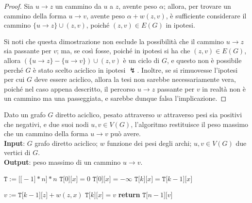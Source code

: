 \documentclass[14pt]{extreport}
\theoremstyle{definition}
\theoremstyle{definition}
\begin{document}
\begin{proof}
    Sia $u \rightarrow z$ un cammino da $u$ a $z$, avente peso $\alpha$; allora, per trovare un cammino della forma $u \rightarrow v$, avente peso $\alpha + w(z, v)$, è sufficiente considerare il cammino $\{u \rightarrow z\} \cup (z, v)$, poiché $(z, v) \in E(G)$ in ipotesi.

    Si noti che questa dimostrazione non esclude la possibilità che il cammino $u \rightarrow z$ sia passante per $v$; ma, se così fosse, poiché in ipotesi si ha che $(z, v) \in E(G)$, allora $(\{u \rightarrow z\} - \{u \rightarrow v\}) \cup (z, v)$ è un ciclo di $G$, e questo non è possibile perché $G$ è stato scelto aciclico in ipotesi $\lightning$. Inoltre, se si rimuovesse l'ipotesi per cui $G$ deve essere aciclico, allora la tesi non sarebbe necessariamente vera, poiché nel caso appena descritto, il percorso $u \rightarrow z$ passante per $v$ in realtà non è un cammino ma una passeggiata, e sarebbe dunque falsa l'implicazione.
\end{proof}

\begin{algorithm}[H]
    \caption{
        Dato un grafo $G$ diretto aciclico, pesato attraverso $w$ attraverso pesi sia positivi che negativi, e due suoi nodi $u, v \in V(G)$, l'algoritmo restituisce il peso massimo che un cammino della forma $u \rightarrow v$ può avere.\\
        \textbf{Input}: $G$ grafo diretto aciclico; $w$ funzione dei pesi degli archi; $u, v \in V(G)$ due vertici di $G$.\\
        \textbf{Output}: peso massimo di un cammino $u \rightarrow v$.
    }

    \begin{algorithmic}[1]
            \State $\texttt{T} := \texttt{[[}-1\texttt{]} * n \texttt{]} * n$
                    \State $\texttt{T[}0\texttt{][}x\texttt{]} = 0$
                \Else
                    \State $\texttt{T[}0\texttt{][}x\texttt{]} = - \infty$
                \EndIf
            \EndFor
                    \State $\texttt{T[}k\texttt{][}x\texttt{]} = \texttt{T[}k -1 \texttt{][}x\texttt{]}$ 

                     
                        \State $v := \texttt{T[}k-1\texttt{][}z\texttt{]} + w(z, x)$
                            \State $\texttt{T[}k\texttt{][}x\texttt{]} = v$
                        \EndIf
                    \EndFor
                \EndFor
            \EndFor
            \State \textbf{return} $\texttt{T[}n- 1\texttt{][}v\texttt{]}$
        \EndFunction
    \end{algorithmic}
\end{algorithm}
\end{document}
